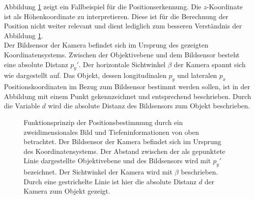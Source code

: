 		Abbildung \ref{fig: positionsbestimmung} zeigt ein Fallbeispiel für die Positionserkennung. Die $z$-Koordinate ist als Höhenkoordinate zu interpretieren. Diese ist für die Berechnung der Position nicht weiter relevant und dient lediglich zum besseren Verständnis der Abbildung \ref{fig: positionsbestimmung}.\\
		\newpage
		 Der Bildsensor der Kamera befindet sich im Ursprung des gezeigten Koordinatensystems. Zwischen der Objektivebene und dem Bildsensor besteht eine absolute Distanz ${p_y}'$. Der horizontale Sichtwinkel $\beta$ der Kamera spannt sich wie dargestellt auf. Das Objekt, dessen longitudinalen $p_y$ und lateralen $p_x$ Positionskoordinaten im Bezug zum Bildsensor bestimmt werden sollen, ist in der Abbildung mit einem Punkt gekennzeichnet und entsprechend beschrieben. Durch die Variable $d$ wird die absolute Distanz des Bildsensors zum Objekt beschrieben.\\
		
			\begin{figure}[H]
			\centering
			
			\caption{Funktionsprinzip der Positionsbestimmung durch ein zweidimensionales Bild und Tiefeninformationen von oben betrachtet. Der Bildsensor der Kamera befindet sich im Ursprung des Koordinatensystems. Der Abstand zwischen der als gepunktete Linie dargestellte Objektivebene und des Bildsensors wird mit ${p_y}'$ bezeichnet. Der Sichtwinkel der Kamera wird mit $\beta$ beschrieben. Durch eine gestrichelte Linie ist hier die absolute Distanz $d$ der Kamera zum Objekt gezeigt.}
			\label{fig: positionsbestimmung}
		\end{figure}
		
